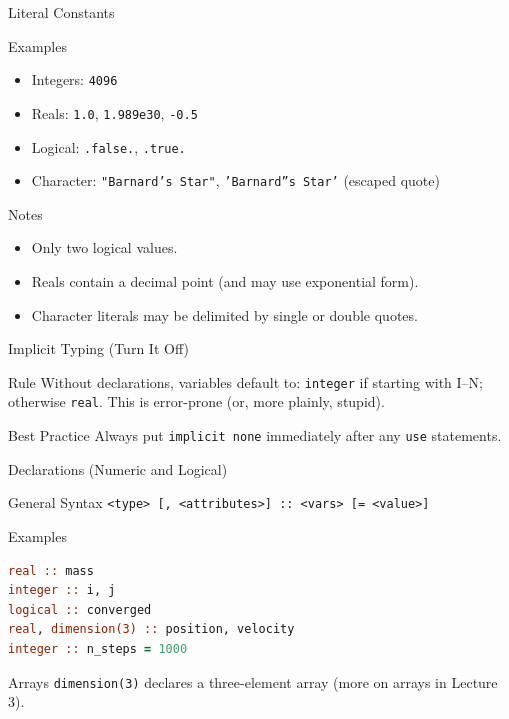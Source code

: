 \begin{frame}{Literal Constants}
  \begin{block}{Examples}
  \begin{itemize}
    \item Integers: \texttt{4096}
    \item Reals: \texttt{1.0}, \texttt{1.989e30}, \texttt{-0.5}
    \item Logical: \texttt{.false.}, \texttt{.true.}
    \item Character: \texttt{"Barnard's Star"}, \texttt{'Barnard''s Star'} (escaped quote)
  \end{itemize}
  \end{block}
  \begin{block}{Notes}
  \begin{itemize}
    \item Only two logical values.
    \item Reals contain a decimal point (and may use exponential form).
    \item Character literals may be delimited by single or double quotes.
  \end{itemize}
  \end{block}
\end{frame}

\begin{frame}{Implicit Typing (Turn It Off)}
  \begin{block}{Rule}
  Without declarations, variables default to: \texttt{integer} if starting with I–N; otherwise \texttt{real}. This is error-prone (or, more plainly, stupid).
  \end{block}
  \begin{block}{Best Practice}
  Always put \texttt{implicit none} immediately after any \texttt{use} statements.
  \end{block}
\end{frame}

\begin{frame}[fragile]{Declarations (Numeric and Logical)}
  \begin{block}{General Syntax}
  \texttt{<type> [, <attributes>] :: <vars> [= <value>]}
  \end{block}
  \begin{block}{Examples}
\begin{lstlisting}[language=Fortran]
real :: mass
integer :: i, j
logical :: converged
real, dimension(3) :: position, velocity
integer :: n_steps = 1000
\end{lstlisting}
  \end{block}
  \begin{block}{Arrays}
  \texttt{dimension(3)} declares a three-element array (more on arrays in Lecture 3).
  \end{block}
\end{frame}

